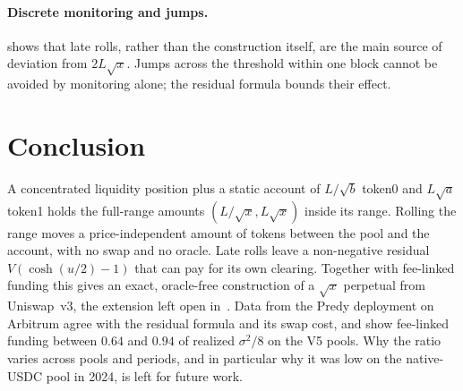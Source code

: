 \documentclass[11pt]{article}
\theoremstyle{definition}
\theoremstyle{remark}
\begin{document}
\paragraph{Discrete monitoring and jumps.}  shows that late rolls, rather than the construction itself, are the main source of deviation from $2L\sqrt{x}$. Jumps across the threshold within one block cannot be avoided by monitoring alone; the residual formula bounds their effect.

\section{Conclusion}

A concentrated liquidity position plus a static account of $L/\sqrt{b}$ token0 and $L\sqrt{a}$ token1 holds the full-range amounts $(L/\sqrt{x},L\sqrt{x})$ inside its range. Rolling the range moves a price-independent amount of tokens between the pool and the account, with no swap and no oracle. Late rolls leave a non-negative residual $V(\cosh(u/2)-1)$ that can pay for its own clearing. Together with fee-linked funding this gives an exact, oracle-free construction of a $\sqrt{x}$ perpetual from Uniswap~v3, the extension left open in~\cite{robinson2024perp}. Data from the Predy deployment on Arbitrum agree with the residual formula and its swap cost, and show fee-linked funding between $0.64$ and $0.94$ of realized $\sigma^2/8$ on the V5 pools. Why the ratio varies across pools and periods, and in particular why it was low on the native-USDC pool in 2024, is left for future work.



\end{document}

